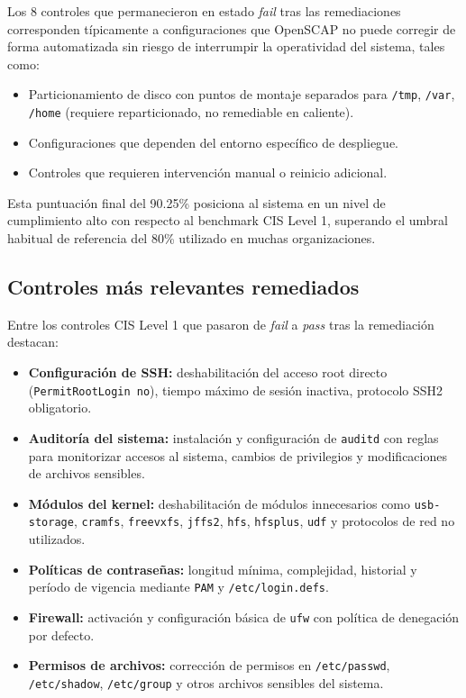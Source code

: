 \documentclass[12pt,letterpaper]{article}
\begin{document}
Los 8 controles que permanecieron en estado \textit{fail} tras las remediaciones corresponden típicamente a configuraciones que OpenSCAP no puede corregir de forma automatizada sin riesgo de interrumpir la operatividad del sistema, tales como:

\begin{itemize}
  \item Particionamiento de disco con puntos de montaje separados para \texttt{/tmp}, \texttt{/var}, \texttt{/home} (requiere reparticionado, no remediable en caliente).
  \item Configuraciones que dependen del entorno específico de despliegue.
  \item Controles que requieren intervención manual o reinicio adicional.
\end{itemize}

Esta puntuación final del 90.25\% posiciona al sistema en un nivel de cumplimiento alto con respecto al benchmark CIS Level 1, superando el umbral habitual de referencia del 80\% utilizado en muchas organizaciones.

\subsection{Controles más relevantes remediados}

Entre los controles CIS Level 1 que pasaron de \textit{fail} a \textit{pass} tras la remediación destacan:

\begin{itemize}
  \item \textbf{Configuración de SSH:} deshabilitación del acceso root directo (\texttt{PermitRootLogin no}), tiempo máximo de sesión inactiva, protocolo SSH2 obligatorio.
  \item \textbf{Auditoría del sistema:} instalación y configuración de \texttt{auditd} con reglas para monitorizar accesos al sistema, cambios de privilegios y modificaciones de archivos sensibles.
  \item \textbf{Módulos del kernel:} deshabilitación de módulos innecesarios como \texttt{usb-storage}, \texttt{cramfs}, \texttt{freevxfs}, \texttt{jffs2}, \texttt{hfs}, \texttt{hfsplus}, \texttt{udf} y protocolos de red no utilizados.
  \item \textbf{Políticas de contraseñas:} longitud mínima, complejidad, historial y período de vigencia mediante \texttt{PAM} y \texttt{/etc/login.defs}.
  \item \textbf{Firewall:} activación y configuración básica de \texttt{ufw} con política de denegación por defecto.
  \item \textbf{Permisos de archivos:} corrección de permisos en \texttt{/etc/passwd}, \texttt{/etc/shadow}, \texttt{/etc/group} y otros archivos sensibles del sistema.
\end{itemize}
\end{document}
